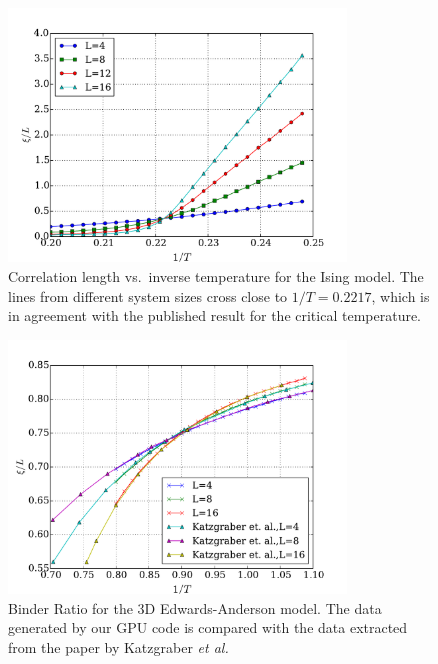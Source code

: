   \begin{figure}[ht!]
    \centering
    \includegraphics[width=0.8\textwidth]{img/ising_corr.pdf}
    \caption{Correlation length vs.\ inverse temperature for the Ising model. The lines from different system sizes cross
    close to $1/T=0.2217$, which is in agreement with the published result for the critical temperature.~\cite{PhysRevB.44.5081}}
    \label{fig:corr-ising}
    \end{figure}

  \begin{figure}[ht!]
    \centering
    \includegraphics[width=0.8\textwidth]{img/binder_compare.pdf}
    \caption{Binder Ratio for the 3D Edwards-Anderson model. The data generated by our GPU code is compared 
    with the data extracted from the paper by Katzgraber {\it et al.} \cite{Katzgraber-Korner-Young-2006}}
    \label{fig:binder-ea}
    \end{figure}


